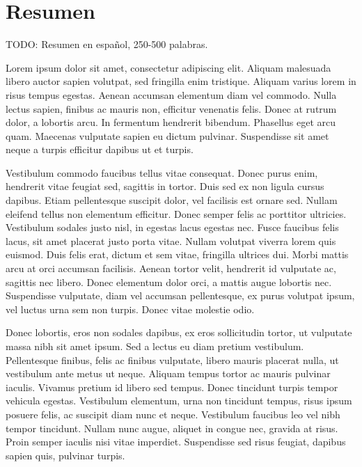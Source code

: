 \chapter*{Resumen}

\begin{abstractEs}
	TODO: Resumen en español, 250-500 palabras.
	
	Lorem ipsum dolor sit amet, consectetur adipiscing elit. Aliquam malesuada libero auctor sapien volutpat, sed fringilla enim tristique. Aliquam varius lorem in risus tempus egestas. Aenean accumsan elementum diam vel commodo. Nulla lectus sapien, finibus ac mauris non, efficitur venenatis felis. Donec at rutrum dolor, a lobortis arcu. In fermentum hendrerit bibendum. Phasellus eget arcu quam. Maecenas vulputate sapien eu dictum pulvinar. Suspendisse sit amet neque a turpis efficitur dapibus ut et turpis.
	
	Vestibulum commodo faucibus tellus vitae consequat. Donec purus enim, hendrerit vitae feugiat sed, sagittis in tortor. Duis sed ex non ligula cursus dapibus. Etiam pellentesque suscipit dolor, vel facilisis est ornare sed. Nullam eleifend tellus non elementum efficitur. Donec semper felis ac porttitor ultricies. Vestibulum sodales justo nisl, in egestas lacus egestas nec. Fusce faucibus felis lacus, sit amet placerat justo porta vitae. Nullam volutpat viverra lorem quis euismod. Duis felis erat, dictum et sem vitae, fringilla ultrices dui. Morbi mattis arcu at orci accumsan facilisis. Aenean tortor velit, hendrerit id vulputate ac, sagittis nec libero. Donec elementum dolor orci, a mattis augue lobortis nec. Suspendisse vulputate, diam vel accumsan pellentesque, ex purus volutpat ipsum, vel luctus urna sem non turpis. Donec vitae molestie odio.
	
	Donec lobortis, eros non sodales dapibus, ex eros sollicitudin tortor, ut vulputate massa nibh sit amet ipsum. Sed a lectus eu diam pretium vestibulum. Pellentesque finibus, felis ac finibus vulputate, libero mauris placerat nulla, ut vestibulum ante metus ut neque. Aliquam tempus tortor ac mauris pulvinar iaculis. Vivamus pretium id libero sed tempus. Donec tincidunt turpis tempor vehicula egestas. Vestibulum elementum, urna non tincidunt tempus, risus ipsum posuere felis, ac suscipit diam nunc et neque. Vestibulum faucibus leo vel nibh tempor tincidunt. Nullam nunc augue, aliquet in congue nec, gravida at risus. Proin semper iaculis nisi vitae imperdiet. Suspendisse sed risus feugiat, dapibus sapien quis, pulvinar turpis.
	
\end{abstractEs}

